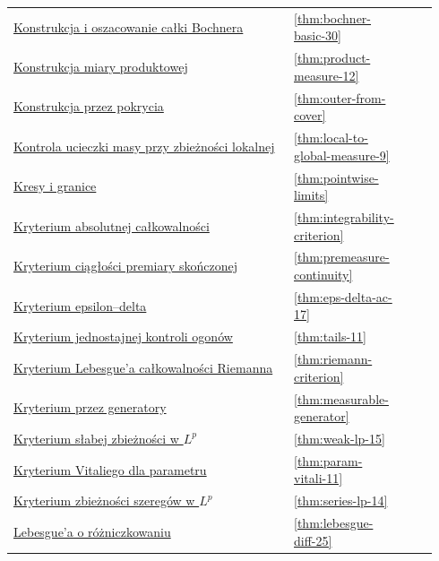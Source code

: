 \documentclass[11pt,a4paper,oneside]{book}
\numberwithin{equation}{chapter}
\theoremstyle{plain}
\theoremstyle{definition}
\theoremstyle{remark}
\begin{document}
\begin{longtable}{@{}p{0.72\linewidth}p{0.135\linewidth}p{0.08\linewidth}@{}}
\hyperref[thm:bochner-basic-30]{Konstrukcja i oszacowanie całki Bochnera} & \ref*{thm:bochner-basic-30} & \pageref*{thm:bochner-basic-30} \\
\hyperref[thm:product-measure-12]{Konstrukcja miary produktowej} & \ref*{thm:product-measure-12} & \pageref*{thm:product-measure-12} \\
\hyperref[thm:outer-from-cover]{Konstrukcja przez pokrycia} & \ref*{thm:outer-from-cover} & \pageref*{thm:outer-from-cover} \\
\hyperref[thm:local-to-global-measure-9]{Kontrola ucieczki masy przy zbieżności lokalnej} & \ref*{thm:local-to-global-measure-9} & \pageref*{thm:local-to-global-measure-9} \\
\hyperref[thm:pointwise-limits]{Kresy i granice} & \ref*{thm:pointwise-limits} & \pageref*{thm:pointwise-limits} \\
\hyperref[thm:integrability-criterion]{Kryterium absolutnej całkowalności} & \ref*{thm:integrability-criterion} & \pageref*{thm:integrability-criterion} \\
\hyperref[thm:premeasure-continuity]{Kryterium ciągłości premiary skończonej} & \ref*{thm:premeasure-continuity} & \pageref*{thm:premeasure-continuity} \\
\hyperref[thm:eps-delta-ac-17]{Kryterium epsilon--delta} & \ref*{thm:eps-delta-ac-17} & \pageref*{thm:eps-delta-ac-17} \\
\hyperref[thm:tails-11]{Kryterium jednostajnej kontroli ogonów} & \ref*{thm:tails-11} & \pageref*{thm:tails-11} \\
\hyperref[thm:riemann-criterion]{Kryterium Lebesgue'a całkowalności Riemanna} & \ref*{thm:riemann-criterion} & \pageref*{thm:riemann-criterion} \\
\hyperref[thm:measurable-generator]{Kryterium przez generatory} & \ref*{thm:measurable-generator} & \pageref*{thm:measurable-generator} \\
\hyperref[thm:weak-lp-15]{Kryterium słabej zbieżności w $L^p$} & \ref*{thm:weak-lp-15} & \pageref*{thm:weak-lp-15} \\
\hyperref[thm:param-vitali-11]{Kryterium Vitaliego dla parametru} & \ref*{thm:param-vitali-11} & \pageref*{thm:param-vitali-11} \\
\hyperref[thm:series-lp-14]{Kryterium zbieżności szeregów w $L^p$} & \ref*{thm:series-lp-14} & \pageref*{thm:series-lp-14} \\
\hyperref[thm:lebesgue-diff-25]{Lebesgue'a o różniczkowaniu} & \ref*{thm:lebesgue-diff-25} & \pageref*{thm:lebesgue-diff-25} \\

\end{longtable}
\end{document}
